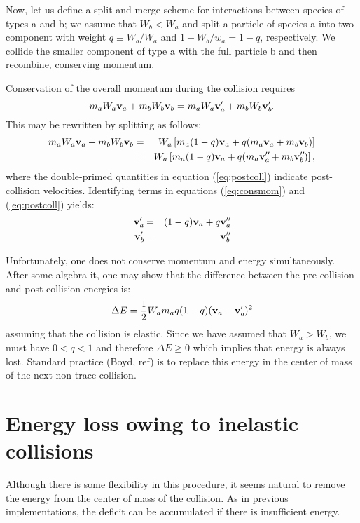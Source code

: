 \documentclass[12pt]{article}
\newcommand*{\myprime}{^{\prime}\mkern-1.2mu}
\newcommand*{\mydprime}{^{\prime\prime}\mkern-1.2mu}
\newcommand{\bv}{{\bf v}}
\newcommand{\va}{\bv_a}
\newcommand{\vb}{\bv_b}
\newcommand{\vap}{\va\myprime}
\newcommand{\vbp}{\vb\myprime}
\begin{document}
Now, let us define a split and merge scheme for interactions between
species of types a and b; we assume that $W_b < W_a$ and split a
particle of species a into two component with weight $q\equiv W_b/W_a$
and $1 - W_b/w_a = 1 - q$, respectively.  We collide the smaller
component of type a with the full particle b and then recombine,
conserving momentum.

Conservation of the overall momentum during the collision
requires
\begin{equation}
  m_a W_a \va + m_ b W_b \vb = m_a W_a \vap + m_b W_b \vbp.
  \label{eq:consmom}
\end{equation}
This may be rewritten by splitting as follows:
\begin{eqnarray}
  m_a W_a \va + m_ b W_b \vb &=& W_a\left[ m_a (1-q) \va + q(m_a\va +
    m_b \vb) \right] \\ \label{eq:precoll}
  &=& W_a\left[ m_a (1-q) \va + q(m_a\va\mydprime +
    m_b \vb\mydprime) \right], \label{eq:postcoll}
\end{eqnarray}
where the double-primed quantities in equation (\ref{eq:postcoll})
indicate post-collision velocities.  Identifying terms in equations
(\ref{eq:consmom}) and (\ref{eq:postcoll}) yields:
\begin{eqnarray}
  \vap &=& (1-q)\va + q\va\mydprime \\
  \vbp &=& \vb\mydprime
\end{eqnarray}

Unfortunately, one does not conserve momentum and energy
simultaneously.  After some algebra it, one may show that the
difference between the pre-collision and post-collision energies is:
\begin{equation}
  \Delta E = \frac12 W_a m_a q(1-q)(\va - \vap)^2
\end{equation}
assuming that the collision is elastic. Since we have assumed that
$W_a>W_b$, we must have $0<q<1$ and therefore $\Delta E \ge 0$ which
implies that energy is always lost.  Standard practice (Boyd, ref) is
to replace this energy in the center of mass of the next non-trace
collision.

\section{Energy loss owing to inelastic collisions}

Although there is some flexibility in this procedure, it seems natural
to remove the energy from the center of mass of the collision.  As in
previous implementations, the deficit can be accumulated if there is
insufficient energy.
\end{document}
